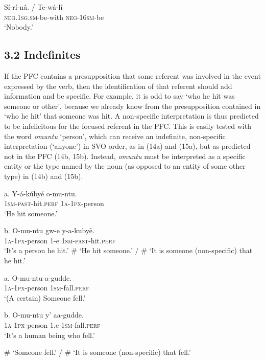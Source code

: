 \documentclass[output=paper]{langsci/langscibook}
\begin{document}
\ea
\gll Sí-rí-nâ.      /   Te-wá-lî\\
     \textsc{neg.1sg.sm}{}-be-with    \textsc{neg-16sm}{}-be\\
\glt ‘Nobody.’
\z

\subsection{3.2 Indefinites}

If the PFC contains a presupposition that some referent was involved in the event expressed by the verb, then the identification of that referent should add information and be specific. For example, it is odd to say ‘who he hit was someone or other’, because we already know from the presupposition contained in ‘who he hit’ that someone was hit. A non-specific interpretation is thus predicted to be infelicitous for the focused referent in the PFC. This is easily tested with the word \textit{omuntu} ‘person’, which can receive an indefinite, non-specific interpretation (‘anyone’) in SVO order, as in (14a) and (15a), but as predicted not in the PFC (14b, 15b). Instead, \textit{omuntu} must be interpreted as a specific entity or the type named by the noun (as opposed to an entity of some other type) in (14b) and (15b).

\ea
\gll   a.  Y-á-kúbyé    o-mu-ntu.\\
         \textsc{1sm-past}{}-hit.\textsc{perf}  \textsc{1a-1px}{}-person\\
\glt     ‘He hit someone.’
\z

\ea
\gll   b.  O-mu-ntu    gw-e  y-a-kubyȇ.\\
         \textsc{1a-1px}{}-person  1-e  \textsc{1sm-past}{}-hit.\textsc{perf}\\
\glt     ‘It’s a person he hit.’ 
\glt     \# ‘He hit someone.’ / \# ‘It is someone (non-specific) that he hit.’
\z

\ea
\gll   a.  O-mu-ntu    a-gudde.\\
         \textsc{1a-1px}{}-person  1\textsc{sm}{}-fall.\textsc{perf}\\
\glt     ‘(A certain) Someone fell.’
\z

\ea
\gll   b.  O-mu-ntu    y’  aa-gudde.\\
         \textsc{1a-1px}{}-person  1.e  \textsc{1sm}{}-fall.\textsc{perf}\\
\glt     ‘It’s a human being who fell.’

\glt     \# ‘Someone fell.’ / \# ‘It is someone (non-specific) that fell.’
\z
\end{document}

